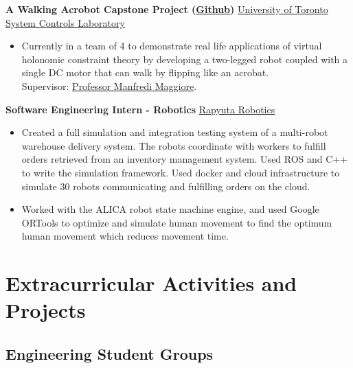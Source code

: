 \documentclass[10pt, a4paper]{cv}
\begin{document}
	\textbf{A Walking Acrobot  Capstone Project (\href{https://github.com/Vuwij/acrobot}{Github})} \hfill \href{https://www.control.utoronto.ca/}{University of Toronto System Controls Laboratory}
\begin{itemize}
	\item Currently in a team of 4 to demonstrate real life applications of virtual holonomic constraint theory by developing a two-legged robot coupled with a single DC motor that can walk by flipping like an acrobat.\\ Supervisor: \href{https://www.control.utoronto.ca/~maggiore/}{Professor Manfredi Maggiore}.
\end{itemize}

	\textbf{Software Engineering Intern - Robotics} \hfill \href{https://www.rapyuta-robotics.com}{Rapyuta Robotics}
	\begin{itemize}
		\item Created a full simulation and integration testing system of a multi-robot warehouse delivery system. The robots coordinate with workers to fulfill orders retrieved from an inventory management system. Used ROS and C++ to write the simulation framework. Used docker and cloud infrastructure to simulate 30 robots communicating and fulfilling orders on the cloud.
		\item Worked with the ALICA robot state machine engine, and used Google ORTools to optimize and simulate human movement to find the optimum human movement which reduces movement time.
	\end{itemize}

\section*{Extracurricular Activities and Projects}

\subsection*{Engineering Student Groups}\noindent
\end{document}
